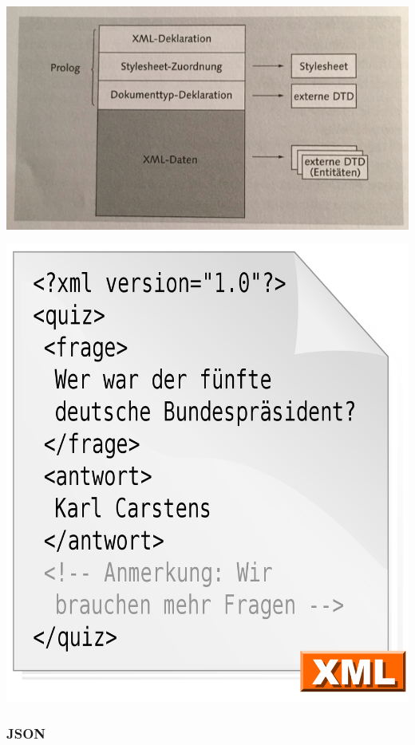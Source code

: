 \begin{center}
\includegraphics[scale=.5]{images/Aufbauschema_eines_XML-Dockuments}

\includegraphics[scale=.3]{images/Xml_datei_Beispiel}
\end{center}
\subsubsection{JSON}

